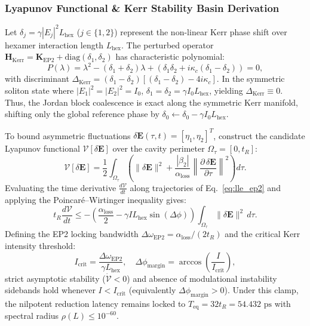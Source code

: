 \documentclass[11pt,onecolumn]{article}
\begin{document}
\subsubsection{Lyapunov Functional \& Kerr Stability Basin Derivation}
Let $\delta_j = \gamma |E_j|^2 L_{\mathrm{hex}}$ ($j \in \{1, 2\}$) represent the non-linear Kerr phase shift over hexamer interaction length $L_{\mathrm{hex}}$. The perturbed operator $\mathbf{H}_{\mathrm{Kerr}} = \mathbf{K}_{\mathrm{EP2}} + \mathrm{diag}(\delta_1, \delta_2)$ has characteristic polynomial:
\begin{equation}
P(\lambda) = \lambda^2 - (\delta_1 + \delta_2)\lambda + \left(\delta_1\delta_2 + i\kappa_c(\delta_1 - \delta_2)\right) = 0,
\end{equation}
with discriminant $\Delta_{\mathrm{Kerr}} = (\delta_1 - \delta_2)[(\delta_1 - \delta_2) - 4i\kappa_c]$. In the symmetric soliton state where $|E_1|^2 = |E_2|^2 = I_0$, $\delta_1 = \delta_2 = \gamma I_0 L_{\mathrm{hex}}$, yielding $\Delta_{\mathrm{Kerr}} \equiv 0$. Thus, the Jordan block coalescence is exact along the symmetric Kerr manifold, shifting only the global reference phase by $\delta_0 \leftarrow \delta_0 - \gamma I_0 L_{\mathrm{hex}}$.

To bound asymmetric fluctuations $\delta\mathbf{E}(\tau, t) = [\eta_1, \eta_2]^T$, construct the candidate Lyapunov functional $\mathcal{V}[\delta\mathbf{E}]$ over the cavity perimeter $\Omega_\tau = [0, t_R]$:
\begin{equation}
\mathcal{V}[\delta\mathbf{E}] = \frac{1}{2}\int_{\Omega_\tau} \left( \|\delta\mathbf{E}\|^2 + \frac{|\beta_2|}{\alpha_{\mathrm{loss}}}\left\|\frac{\partial\,\delta\mathbf{E}}{\partial\tau}\right\|^2 \right) d\tau.
\end{equation}
Evaluating the time derivative $\frac{d\mathcal{V}}{dt}$ along trajectories of Eq.~\eqref{eq:lle_ep2} and applying the Poincar\'e--Wirtinger inequality gives:
\begin{equation}
t_R \frac{d\mathcal{V}}{dt} \le -\left( \frac{\alpha_{\mathrm{loss}}}{2} - \gamma I L_{\mathrm{hex}} \sin(\Delta\phi) \right) \int_{\Omega_\tau} \|\delta\mathbf{E}\|^2\,d\tau.
\end{equation}
Defining the EP2 locking bandwidth $\Delta\omega_{\mathrm{EP2}} = \alpha_{\mathrm{loss}} / (2t_R)$ and the critical Kerr intensity threshold:
\begin{equation}
I_{\mathrm{crit}} = \frac{\Delta\omega_{\mathrm{EP2}}}{\gamma L_{\mathrm{hex}}}, \quad \Delta\phi_{\mathrm{margin}} = \arccos\left(\frac{I}{I_{\mathrm{crit}}}\right),
\end{equation}
strict asymptotic stability ($\dot{\mathcal{V}} < 0$) and absence of modulational instability sidebands hold whenever $I < I_{\mathrm{crit}}$ (equivalently $\Delta\phi_{\mathrm{margin}} > 0$). Under this clamp, the nilpotent reduction latency remains locked to $T_{\mathrm{eq}} = 32 t_R = 54.432\text{ ps}$ with spectral radius $\rho(L) \le 10^{-60}$.
\end{document}
